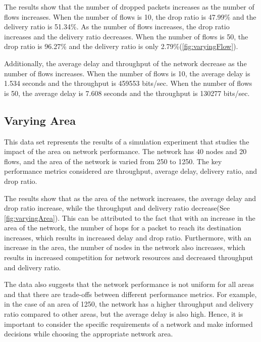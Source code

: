 \documentclass[14pt]{scrartcl} %
\begin{document}
The results show that the number of dropped packets increases as the number of flows increases. When the number of flows is 10, the drop ratio is 47.99\% and the delivery ratio is 51.34\%. As the number of flows increases, the drop ratio increases and the delivery ratio decreases. When the number of flows is 50, the drop ratio is 96.27\% and the delivery ratio is only 2.79\%(\ref{fig:varyingFlow}).

Additionally, the average delay and throughput of the network decrease as the number of flows increases. When the number of flows is 10, the average delay is 1.534 seconds and the throughput is 459553 bits/sec. When the number of flows is 50, the average delay is 7.608 seconds and the throughput is 130277 bits/sec.
\subsection{Varying Area}
This data set represents the results of a simulation experiment that studies the impact of the area on network performance. The network has 40 nodes and 20 flows, and the area of the network is varied from 250 to 1250. The key performance metrics considered are throughput, average delay, delivery ratio, and drop ratio.

The results show that as the area of the network increases, the average delay and drop ratio increase, while the throughput and delivery ratio decrease(See \ref{fig:varyingArea}). This can be attributed to the fact that with an increase in the area of the network, the number of hops for a packet to reach its destination increases, which results in increased delay and drop ratio. Furthermore, with an increase in the area, the number of nodes in the network also increases, which results in increased competition for network resources and decreased throughput and delivery ratio.

The data also suggests that the network performance is not uniform for all areas and that there are trade-offs between different performance metrics. For example, in the case of an area of 1250, the network has a higher throughput and delivery ratio compared to other areas, but the average delay is also high. Hence, it is important to consider the specific requirements of a network and make informed decisions while choosing the appropriate network area.
\end{document}
